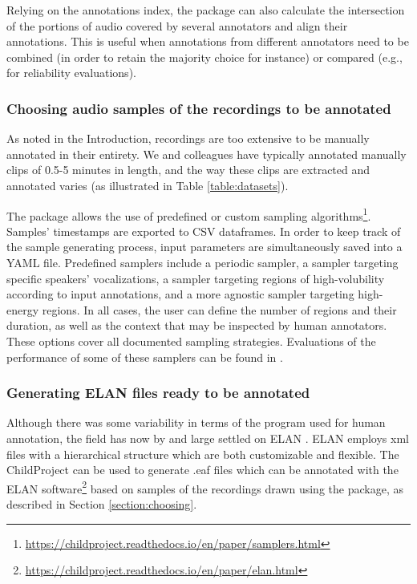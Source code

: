 \documentclass[smallextended]{svjour3}       %
\begin{document}
Relying on the annotations index, the package can also calculate the intersection of the portions of audio covered by several annotators and align their annotations. This is useful when annotations from different annotators need to be combined (in order to retain the majority choice for instance) or compared (e.g., for reliability evaluations).

\subsubsection*{Choosing audio samples of the recordings to be annotated}\label{section:choosing}

As noted in the Introduction, recordings are too extensive to be manually annotated in their entirety. We and colleagues have typically annotated manually clips of 0.5-5 minutes in length, and the way these clips are extracted and annotated varies (as illustrated in Table \ref{table:datasets}).

The package allows the use of predefined or custom sampling algorithms\footnote{\url{https://childproject.readthedocs.io/en/paper/samplers.html}}. Samples' timestamps are exported to CSV dataframes. In order to keep track of the sample generating process, input parameters are simultaneously saved into a YAML file. Predefined samplers include a periodic sampler, a sampler targeting specific speakers' vocalizations, a sampler targeting regions of high-volubility according to input annotations, and a more agnostic sampler targeting high-energy regions. In all cases, the user can define the number of regions and their duration, as well as the context that may be inspected by human annotators. These options cover all documented sampling strategies. Evaluations of the performance of some of these samplers can be found in \citep[Chapter 15, ``Human annotation'']{exelang-book}.

\subsubsection*{Generating ELAN files ready to be annotated}

Although there was some variability in terms of the program used for human annotation, the field has now by and large settled on ELAN \citep{wittenburg2006elan}. ELAN employs xml files with a hierarchical structure which are both customizable and flexible. The ChildProject can be used to generate .eaf files which can be annotated with the ELAN software\footnote{\url{https://childproject.readthedocs.io/en/paper/elan.html}} based on samples of the recordings drawn using the package, as described in Section \ref{section:choosing}.
\end{document}
